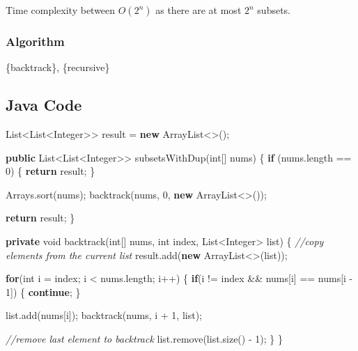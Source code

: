 \documentclass[]{book}
\newenvironment{Shaded}{\begin{snugshade}}{\end{snugshade}}
\newcommand{\BuiltInTok}[1]{#1}
\newcommand{\CommentTok}[1]{\textcolor[rgb]{0.56,0.35,0.01}{\textit{#1}}}
\newcommand{\DataTypeTok}[1]{\textcolor[rgb]{0.13,0.29,0.53}{#1}}
\newcommand{\DecValTok}[1]{\textcolor[rgb]{0.00,0.00,0.81}{#1}}
\newcommand{\FunctionTok}[1]{\textcolor[rgb]{0.00,0.00,0.00}{#1}}
\newcommand{\KeywordTok}[1]{\textcolor[rgb]{0.13,0.29,0.53}{\textbf{#1}}}
\newcommand{\NormalTok}[1]{#1}
\begin{document}
Time complexity between \(O(2^{n})\) as there are at most \(2^n\) subsets.

\hypertarget{algorithm-17}{%
\subsubsection{Algorithm}\label{algorithm-17}}

\{backtrack\}, \{recursive\}

\hypertarget{java-code-13}{%
\subsection{Java Code}\label{java-code-13}}

\begin{Shaded}
\begin{Highlighting}[]
\BuiltInTok{List}\NormalTok{<}\BuiltInTok{List}\NormalTok{<}\BuiltInTok{Integer}\NormalTok{>> result = }\KeywordTok{new} \BuiltInTok{ArrayList}\NormalTok{<>();}

\KeywordTok{public} \BuiltInTok{List}\NormalTok{<}\BuiltInTok{List}\NormalTok{<}\BuiltInTok{Integer}\NormalTok{>> }\FunctionTok{subsetsWithDup}\NormalTok{(}\DataTypeTok{int}\NormalTok{[] nums) \{}
    \KeywordTok{if}\NormalTok{ (nums.}\FunctionTok{length}\NormalTok{ == }\DecValTok{0}\NormalTok{) \{}
        \KeywordTok{return}\NormalTok{ result;}
\NormalTok{    \}}

    \BuiltInTok{Arrays}\NormalTok{.}\FunctionTok{sort}\NormalTok{(nums);}
    \FunctionTok{backtrack}\NormalTok{(nums, }\DecValTok{0}\NormalTok{, }\KeywordTok{new} \BuiltInTok{ArrayList}\NormalTok{<>());}

    \KeywordTok{return}\NormalTok{ result;}
\NormalTok{\}}

\KeywordTok{private} \DataTypeTok{void} \FunctionTok{backtrack}\NormalTok{(}\DataTypeTok{int}\NormalTok{[] nums, }\DataTypeTok{int}\NormalTok{ index, }\BuiltInTok{List}\NormalTok{<}\BuiltInTok{Integer}\NormalTok{> list) \{}
    \CommentTok{//copy elements from the current list}
\NormalTok{    result.}\FunctionTok{add}\NormalTok{(}\KeywordTok{new} \BuiltInTok{ArrayList}\NormalTok{<>(list));}

    \KeywordTok{for}\NormalTok{(}\DataTypeTok{int}\NormalTok{ i = index; i < nums.}\FunctionTok{length}\NormalTok{; i++) \{}
        \KeywordTok{if}\NormalTok{(i != index && nums[i] == nums[i - }\DecValTok{1}\NormalTok{]) \{}
            \KeywordTok{continue}\NormalTok{;}
\NormalTok{        \}}

\NormalTok{        list.}\FunctionTok{add}\NormalTok{(nums[i]);}
        \FunctionTok{backtrack}\NormalTok{(nums, i + }\DecValTok{1}\NormalTok{, list);}

        \CommentTok{//remove last element to backtrack}
\NormalTok{        list.}\FunctionTok{remove}\NormalTok{(list.}\FunctionTok{size}\NormalTok{() - }\DecValTok{1}\NormalTok{);}
\NormalTok{    \}}
\NormalTok{\}}
\end{Highlighting}
\end{Shaded}
\end{document}
